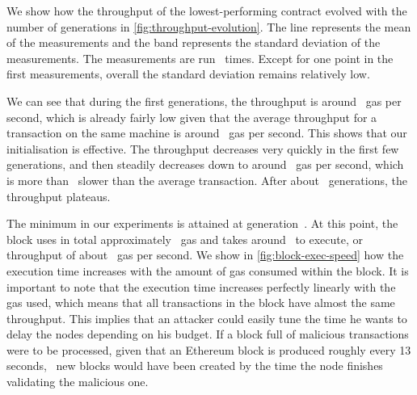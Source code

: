   We show how the throughput of the lowest-performing contract evolved with the number of generations in \autoref{fig:throughput-evolution}. The line represents the mean of the measurements and the band represents the standard deviation of the measurements. The measurements are run~ times.
  Except for one point in the first measurements, overall the standard deviation remains relatively low.

  We can see that during the first generations, the throughput is around~ gas per second, which is already fairly low given that the average throughput for a transaction on the same machine is around~ gas per second. This shows that our initialisation is effective. The throughput decreases very quickly in the first few generations, and then steadily decreases down to around~ gas per second, which is more than~ slower than the average transaction. After about~ generations, the throughput plateaus.

  The minimum in our experiments is attained at generation~. At this point, the block uses in total approximately~ gas and takes around~ to execute, or throughput of about~ gas per second. We show in \autoref{fig:block-exec-speed} how the execution time increases with the amount of gas consumed within the block.
  It is important to note that the execution time increases perfectly linearly with the gas used, which means that all transactions in the block have almost the same throughput. This implies that an attacker could easily tune the time he wants to delay the nodes depending on his budget. If a block full of malicious transactions were to be processed, given that an Ethereum block is produced roughly every 13 seconds,~ new blocks would have been created by the time the node finishes validating the malicious one.

